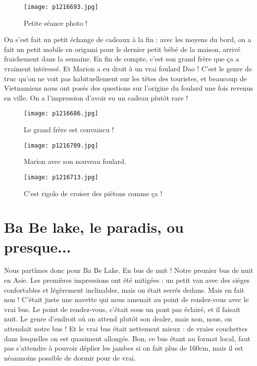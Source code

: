 \documentclass{book}
\begin{document}
\begin{figure}[h]
\centering
\texttt{[image: p1216693.jpg]}
\caption*{Petite séance photo !}
\end{figure}

On s'est fait un petit échange de cadeaux à la fin : avec les moyens du bord, on a fait un petit mobile en origami pour le dernier petit bébé de la maison, arrivé fraichement dans la semaine. En fin de compte, c'est son grand frère que ça a vraiment intéressé. Et Marion a eu droit à un vrai foulard Dao ! C'est le genre de truc qu'on ne voit pas habituellement sur les têtes des touristes, et beaucoup de Vietnamiens nous ont posés des questions sur l'origine du foulard une fois revenus en ville. On a l'impression d'avoir eu un cadeau plutôt rare !


\begin{figure}[h]
\centering
\texttt{[image: p1216686.jpg]}
\caption*{Le grand frère est convaincu !}
\end{figure}


\begin{figure}[h]
\centering
\texttt{[image: p1216709.jpg]}
\caption*{Marion avec son nouveau foulard.}
\end{figure}


\begin{figure}[h]
\centering
\texttt{[image: p1216713.jpg]}
\caption*{C'est rigolo de croiser des piétons comme ça !}
\end{figure}



\chapter{Ba Be lake, le paradis, ou presque...}
Nous partîmes donc pour Ba Be Lake. En bus de nuit ! Notre premier bus de nuit en Asie. Les premières impressions ont été mitigées : un petit van avec des sièges confortables et légèrement inclinables, mais on était serrés dedans. Mais en fait non ! C'était juste une navette qui nous amenait au point de rendez-vous avec le vrai bus. Le point de rendez-vous, c'était sous un pont pas éclairé, et il faisait nuit. Le genre d'endroit où on attend plutôt son dealer, mais non, nous, on attendait notre bus ! Et le vrai bus était nettement mieux : de vraies couchettes dans lesquelles on est quasiment allongés. Bon, ce bus étant au format local, faut pas s'attendre à pouvoir déplier les jambes si on fait plus de 160cm, mais il est néanmoins possible de dormir pour de vrai.
\end{document}

